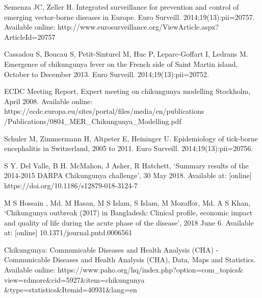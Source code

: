 \documentclass[conference]{IEEEtran}
\begin{document}
\begin{thebibliography}{1}

Semenza JC, Zeller H. Integrated surveillance for prevention and control of emerging vector-borne diseases in Europe. Euro Surveill. 2014;19(13):pii=20757. Available online: http://www.eurosurveillance.org/ViewArticle.aspx?ArticleId=20757

Cassadou S, Boucau S, Petit-Sinturel M, Huc P, Leparc-Goffart I, Ledrans M. Emergence of chikungunya fever on the French side of Saint Martin island, October to December 2013. Euro Surveill. 2014;19(13):pii=20752.

ECDC Meeting Report, Expert meeting on chikungunya modelling Stockholm, April 2008. Available online: https://ecdc.europa.eu/sites/portal/files/media/en/publications
/Publications/0804\_MER\_Chikungunya\_Modelling.pdf

Schuler M, Zimmermann H, Altpeter E, Heininger U. Epidemiology of tick-borne encephalitis in Switzerland, 2005 to 2011. Euro Surveill. 2014;19(13):pii=20756.

S Y. Del Valle, B H. McMahon, J Asher, R Hatchett, ‘Summary results of the 2014-2015 DARPA Chikungunya challenge’, 30 May 2018. Available at: [online] https://doi.org/10.1186/s12879-018-3124-7

M S Hossain , Md. M Hasan, M S Islam, S Islam, M Mozaffor, Md. A S Khan, ‘Chikungunya outbreak (2017) in Bangladesh: Clinical profile, economic impact and quality of life during the acute phase of the disease’, 2018 June 6. Available at: [online] 10.1371/journal.pntd.0006561

Chikungunya: Communicable Diseases and Health Analysis (CHA) - Communicable Diseases and Health Analysis (CHA), Data, Maps and Statistics. Available online: https://www.paho.org/hq/index.php?option=com\_topics\&
view=rdmore\&cid=5927\&item=chikungunya
\&type=statistics\&Itemid=40931\&lang=en


\end{thebibliography}




\end{document}
